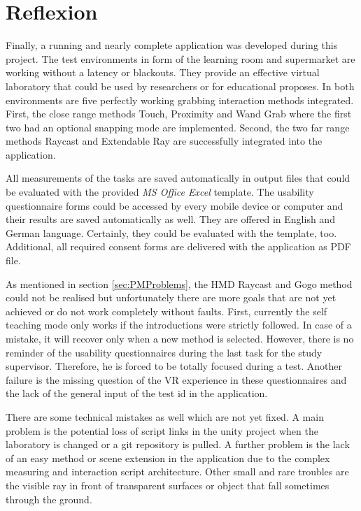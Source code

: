 \section{Reflexion} \label{sec:Reflexion}

Finally, a running and nearly complete application was developed during this project.
The test environments in form of the learning room and supermarket are working without a latency or blackouts. They provide an effective virtual laboratory that could be used by researchers or for educational proposes. In both environments are five perfectly working grabbing interaction methods integrated. First, the close range methods Touch, Proximity and Wand Grab where the first two had an optional snapping mode are implemented. Second, the two far range methods Raycast and Extendable Ray are successfully integrated into the application.
 
All measurements of the tasks are saved automatically in output files that could be evaluated with the provided \textit{MS Office Excel} template. 
The usability questionnaire forms could be accessed by every mobile device or computer and their results are saved automatically as well. They are offered in English and German language. Certainly, they could be evaluated with the template, too. Additional, all required consent forms are delivered with the application as PDF file.

As mentioned in section \ref{sec:PMProblems}, the HMD Raycast and Gogo method could not be realised but unfortunately there are more goals that are not yet achieved or do not work completely without faults. First, currently the self teaching mode only works if the introductions were strictly followed. In case of a mistake, it will recover only when a new method is selected. However, there is no reminder of the usability questionnaires during the last task for the study supervisor. Therefore, he is forced to be totally focused during a test. Another failure is the missing question of the VR experience in these questionnaires and the lack of the general input of the test id in the application.

There are some technical mistakes as well which are not yet fixed. A main problem is the potential loss of script links in the unity project when the laboratory is changed or a git repository is pulled. A further problem is the lack of an easy method or scene extension in the application due to the complex measuring and interaction script architecture. Other small and rare troubles are the visible ray in front of transparent surfaces or object that fall sometimes through the ground.

\newpage

























